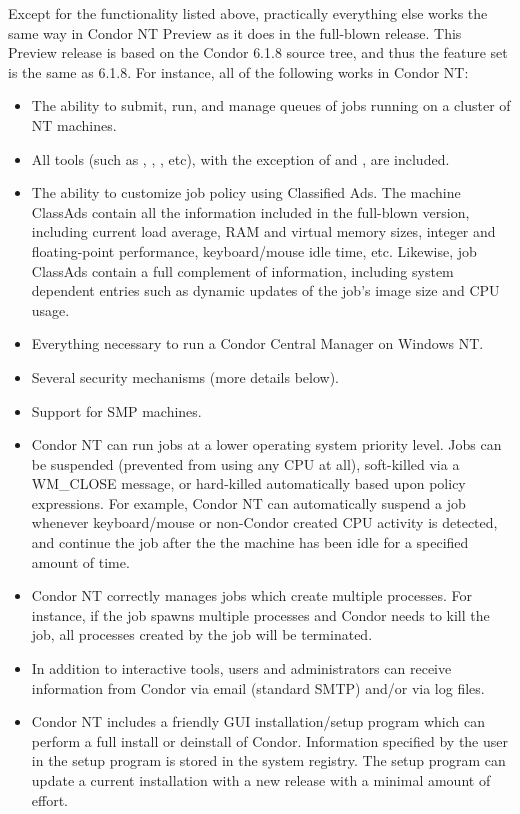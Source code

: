 Except for the functionality listed above, practically everything else works
the same way in Condor NT Preview as it does in the full-blown release.
This Preview release is based on the Condor 6.1.8 source tree, and thus the
feature set is the same as 6.1.8.  For instance, all of the following works in Condor NT:
\begin{itemize}

\item The ability to submit, run, and manage queues of jobs running on a
cluster of NT machines.

\item All tools (such as , , ,
etc), with the exception of  and , are included.

\item The ability to customize job policy using Classified Ads.  The machine
ClassAds contain all the information included in the full-blown version,
including current load average, RAM and virtual memory sizes, integer and
floating-point performance, keyboard/mouse idle time, etc.  Likewise, job
ClassAds contain a full complement of information, including system
dependent entries such as dynamic updates of the job's image size and CPU
usage.

\item Everything necessary to run a Condor Central Manager on Windows NT.

\item Several security mechanisms (more details below).

\item Support for SMP machines.

\item Condor NT can run jobs at a lower operating system priority level.
Jobs can be suspended (prevented from using any CPU at all), soft-killed via
a WM\_CLOSE message, or hard-killed automatically based upon policy
expressions.  For example, Condor NT can automatically suspend a job
whenever keyboard/mouse or non-Condor created CPU activity is detected, and
continue the job after the the machine has been idle for a specified amount
of time.

\item Condor NT correctly manages jobs which create multiple processes.  For
instance, if the job spawns multiple processes and Condor needs to kill the
job, all processes created by the job will be terminated.

\item In addition to interactive tools, users and administrators can receive
information from Condor via email (standard SMTP) and/or via log files.

\item Condor NT includes a friendly GUI installation/setup program which can
perform a full install or deinstall of Condor.
Information specified by the user in the setup program is stored in the
system registry.  The setup program can update a current installation with a
new release with a minimal amount of effort.

\end{itemize}

